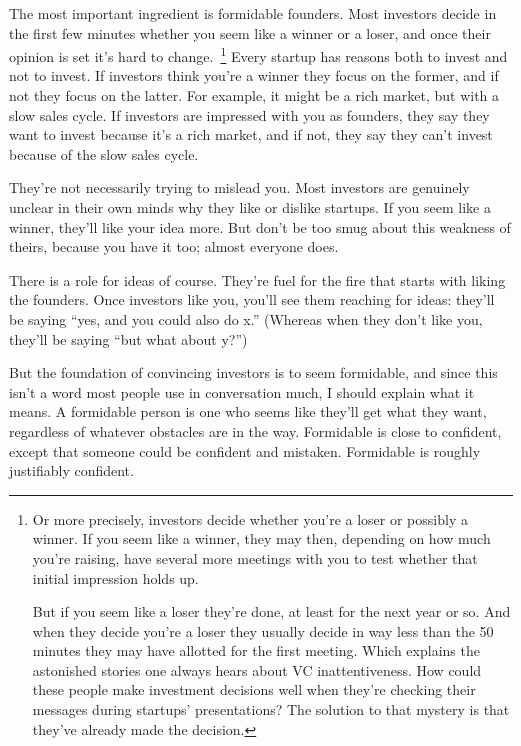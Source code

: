 The most important ingredient is formidable founders. Most investors
decide in the first few minutes whether you seem like a winner or a
loser, and once their opinion is set it's hard to
change.~\footnote{Or more precisely, investors decide whether you're a loser or
possibly a winner. If you seem like a winner, they may then, depending
on how much you're raising, have several more meetings with you to test
whether that initial impression holds up.

But if you seem like a loser they're done, at least for the next year or
so. And when they decide you're a loser they usually decide in way less
than the 50 minutes they may have allotted for the first meeting. Which
explains the astonished stories one always hears about VC
inattentiveness. How could these people make investment decisions well
when they're checking their messages during startups' presentations? The
solution to that mystery is that they've already made the decision.} Every startup has reasons both to invest
and not to invest. If investors think you're a winner they focus on the
former, and if not they focus on the latter. For example, it might be a
rich market, but with a slow sales cycle. If investors are impressed
with you as founders, they say they want to invest because it's a rich
market, and if not, they say they can't invest because of the slow sales
cycle.

They're not necessarily trying to mislead you. Most investors are
genuinely unclear in their own minds why they like or dislike startups.
If you seem like a winner, they'll like your idea more. But don't be too
smug about this weakness of theirs, because you have it too; almost
everyone does.

There is a role for ideas of course. They're fuel for the fire that
starts with liking the founders. Once investors like you, you'll see
them reaching for ideas: they'll be saying ``yes, and you could also do
x.'' (Whereas when they don't like you, they'll be saying ``but what
about y?'')

But the foundation of convincing investors is to seem formidable, and
since this isn't a word most people use in conversation much, I should
explain what it means. A formidable person is one who seems like they'll
get what they want, regardless of whatever obstacles are in the way.
Formidable is close to confident, except that someone could be confident
and mistaken. Formidable is roughly justifiably confident.

